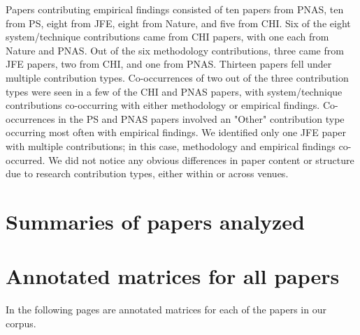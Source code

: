 Papers contributing empirical findings consisted of ten papers from PNAS, ten from
PS, eight from JFE, eight from Nature, and five from CHI. Six of the eight
system/technique contributions came from CHI papers, with one each from Nature and PNAS.
Out of the six methodology contributions, three came from JFE papers, two from
CHI, and one from PNAS. Thirteen papers fell under multiple contribution types.
Co-occurrences of two out of the three contribution types were seen in a few of
the CHI and PNAS papers, with system/technique contributions co-occurring
with either methodology or empirical findings. Co-occurrences in the PS and PNAS
papers involved an "Other" contribution type occurring most often with empirical
findings. We identified only one JFE paper with multiple contributions; in this
case, methodology and empirical findings co-occurred. We did not notice any
obvious differences in paper content or structure due to research contribution
types, either within or across venues.

\clearpage
\section{Summaries of papers analyzed}
\tableContributions


\section{Annotated matrices for all papers}
In the following pages are annotated matrices for each of the papers in our corpus. 
\pagestyle{fancy}
 